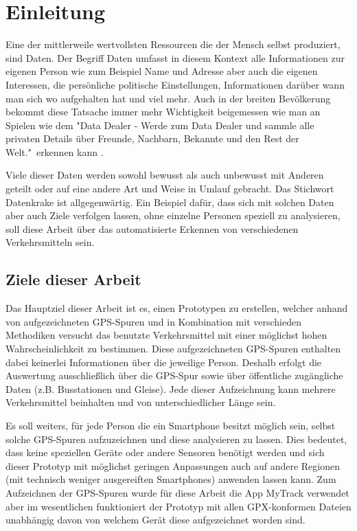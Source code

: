 \chapter{Einleitung}
Eine der mittlerweile wertvollsten Ressourcen die der Mensch selbst produziert, sind Daten. Der Begriff Daten umfasst in diesem Kontext alle Informationen zur eigenen Person wie zum Beispiel Name und Adresse aber auch die eigenen Interessen, die persönliche politische Einstellungen, Informationen darüber wann man sich wo aufgehalten hat und viel mehr. Auch in der breiten Bevölkerung bekommt diese Tatsache immer mehr Wichtigkeit beigemessen wie man an Spielen wie dem "Data Dealer - Werde zum Data Dealer und sammle alle privaten Details über Freunde, Nachbarn, Bekannte und den Rest der Welt."\ erkennen kann \cite{data_dealer_data_2015}.

Viele dieser Daten werden sowohl  bewusst als auch unbewusst mit Anderen geteilt oder auf eine andere Art und Weise in Umlauf gebracht. Das Stichwort Datenkrake ist allgegenwärtig. Ein Beispiel dafür, dass sich mit solchen Daten aber auch Ziele verfolgen lassen, ohne einzelne Personen speziell zu analysieren, soll diese Arbeit über das automatisierte Erkennen von verschiedenen Verkehrsmitteln sein.

\section{Ziele dieser Arbeit}
Das Hauptziel dieser Arbeit ist es, einen Prototypen zu erstellen, welcher anhand von aufgezeichneten GPS-Spuren und in Kombination mit verschieden Methodiken versucht das benutzte  Verkehrsmittel mit einer möglichst hohen Wahrscheinlichkeit zu bestimmen. Diese aufgezeichneten GPS-Spuren enthalten dabei keinerlei Informationen über die jeweilige Person. Deshalb erfolgt die Auswertung ausschließlich über die GPS-Spur sowie über öffentliche zugängliche Daten (z.B. Busstationen und Gleise). Jede dieser Aufzeichnung kann mehrere Verkehrsmittel beinhalten und von unterschiedlicher Länge sein.

Es soll weiters, für jede Person die ein Smartphone besitzt möglich sein, selbst solche GPS-Spuren aufzuzeichnen und diese analysieren zu lassen. Dies bedeutet, dass keine speziellen Geräte oder andere Sensoren benötigt werden und sich dieser Prototyp mit möglichst geringen Anpassungen auch auf andere Regionen (mit technisch weniger ausgereiften Smartphones) anwenden lassen kann. Zum Aufzeichnen der GPS-Spuren wurde für diese Arbeit die App MyTrack verwendet aber im wesentlichen funktioniert der Prototyp mit allen GPX-konformen Dateien unabhängig davon von welchem Gerät diese aufgezeichnet worden sind.

